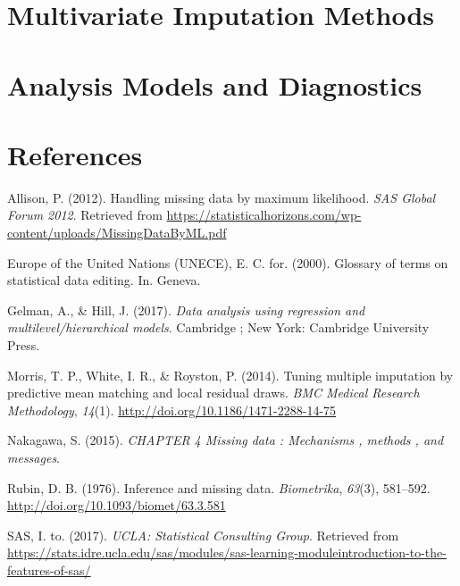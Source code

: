 \documentclass[12pt,oneside]{chicagocapstone}
\begin{document}
\chapter{Multivariate Imputation
Methods}\label{multivariate-imputation-methods}

\chapter{Analysis Models and
Diagnostics}\label{analysis-models-and-diagnostics}

\backmatter

\chapter*{References}\label{references}


\noindent

\setlength{\parindent}{-0.20in} \setlength{\leftskip}{0.20in}
\setlength{\parskip}{8pt}

\hypertarget{refs}{}
\hypertarget{ref-allison_handling_2012}{}
Allison, P. (2012). Handling missing data by maximum likelihood.
\emph{SAS Global Forum 2012}. Retrieved from
\url{https://statisticalhorizons.com/wp-content/uploads/MissingDataByML.pdf}

\hypertarget{ref-econ_commission}{}
Europe of the United Nations (UNECE), E. C. for. (2000). Glossary of
terms on statistical data editing. In. Geneva.

\hypertarget{ref-gelman_data_2017}{}
Gelman, A., \& Hill, J. (2017). \emph{Data analysis using regression and
multilevel/hierarchical models}. Cambridge ; New York: Cambridge
University Press.

\hypertarget{ref-morris_tuning_2014}{}
Morris, T. P., White, I. R., \& Royston, P. (2014). Tuning multiple
imputation by predictive mean matching and local residual draws.
\emph{BMC Medical Research Methodology}, \emph{14}(1).
\url{http://doi.org/10.1186/1471-2288-14-75}

\hypertarget{ref-nakagawa_chapter_2015}{}
Nakagawa, S. (2015). \emph{CHAPTER 4 Missing data : Mechanisms , methods
, and messages}.

\hypertarget{ref-rubin_inference_1976}{}
Rubin, D. B. (1976). Inference and missing data. \emph{Biometrika},
\emph{63}(3), 581--592. \url{http://doi.org/10.1093/biomet/63.3.581}

\hypertarget{ref-introduction_to_sas_notitle_2017}{}
SAS, I. to. (2017). \emph{UCLA: Statistical Consulting Group}. Retrieved
from
\url{https://stats.idre.ucla.edu/sas/modules/sas-learning-moduleintroduction-to-the-features-of-sas/}
\end{document}
